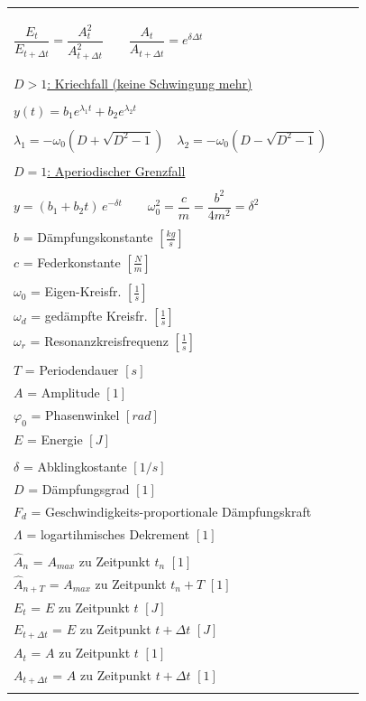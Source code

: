 \begin{tabular}{|p{4cm}|p{8cm}|p{6cm}|}
\begin{minipage}[]{8cm}
		$\Lambda=\delta T=\dfrac{2\pi D}{\sqrt{1-D^2}}=\ln{\dfrac{\hat
		A_n}{\hat A_{n+T}}}\qquad\dfrac{\hat A_n}{\hat A_{n+T}}=e^{\delta T}$\\ \\ \\
		$\dfrac{E_t}{E_{t+\Delta t}}=\dfrac{A_t^2}{A_{t+\Delta t}^2} \qquad
		\dfrac{A_t}{A_{t+\Delta t}}= e^{\delta \Delta t} $\\ \\ \\
		\underline{$D>1$: Kriechfall (keine Schwingung mehr)}\\ \\
		$y(t)=b_1 e^{\lambda_1 t}+b_2e^{\lambda_2 t}$\\ \\
		$\lambda_1=-\omega_0(D+\sqrt{D^2-1})\quad\lambda_2=-\omega_0(D-\sqrt{D^2-1})$\\ \\
		\underline{$D=1$: Aperiodischer Grenzfall}\\ \\
		$y=(b_1+b_2 t)\,e^{-\delta t} \qquad
		\omega_0^2=\dfrac{c}{m}=\dfrac{b^2}{4m^2}=\delta^2$\\
	\end{minipage} &
	\begin{minipage}[]{6cm}
 		$m$ = Masse $[kg]$\\
 		$b$ = Dämpfungskonstante $[\frac{kg}{s}]$\\
 		$c$ = Federkonstante $[\frac{N}{m}]$\\ \\
 		$\omega_0$ = Eigen-Kreisfr. $[\frac{1}{s}]$\\
 		$\omega_d$ = gedämpfte Kreisfr. $[\frac{1}{s}]$\\
 		$\omega_r$ = Resonanzkreisfrequenz $[\frac{1}{s}]$\\ \\ 				
 		$T$ = Periodendauer $[s]$\\
 		$A$ = Amplitude $[1]$\\
 		$\varphi_0$ = Phasenwinkel $[rad]$ \\ 		
 		$E$ = Energie $[J]$\\ \\
 		$\delta$ = Abklingkostante $[1/s]$\\
 		$D$ = Dämpfungsgrad $[1]$\\
		$F_d$ = Geschwindigkeits-proportionale Dämpfungskraft\\
 		$\Lambda$ = logartihmisches Dekrement $[1]$\\ \\
 		$\hat A_n$ = $A_{max}$ zu Zeitpunkt $t_n$ $[1]$\\
  		$\hat A_{n+T}$ = $A_{max}$ zu Zeitpunkt $t_n+T$ $[1]$\\
  		$E_t$ = $E$ zu Zeitpunkt $t$ $[J]$\\
  		$E_{t+\Delta t}$ = $E$ zu Zeitpunkt $t+\Delta t$ $[J]$\\
  		$A_t$ = $A$ zu Zeitpunkt $t$ $[1]$\\
  		$A_{t+\Delta t}$ = $A$ zu Zeitpunkt $t+\Delta t$ $[1]$\\				
 		

\end{minipage}
\end{tabular}
